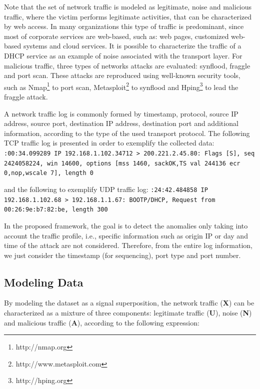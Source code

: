 Note that the set of network traffic is modeled as legitimate, noise and malicious traffic, where the victim performs legitimate activities, that can be characterized by web access. In many organizations this type of traffic is predominant, since most of corporate services are web-based, such as: web pages, customized web-based systems and cloud services. It is possible to characterize the traffic of a DHCP service as an example of noise associated with the transport layer. For malicious traffic, three types of networks attacks are evaluated: synflood, fraggle and port scan. These attacks are reproduced using well-known security tools, such as Nmap\footnote{http://nmap.org} to port scan, Metasploit\footnote{http://www.metasploit.com} to synflood and Hping\footnote{http://hping.org} to lead the fraggle attack.

A network traffic log is commonly formed by timestamp, protocol, source IP address, source port, destination IP address, destination port and additional information, according to the type of the used transport protocol. The following TCP traffic log is presented in order to exemplify the collected data:
\newline
\newline
\texttt{:00:34.099289 IP 192.168.1.102.34712 > 200.221.2.45.80: Flags [S], seq 2424058224, win 14600, options [mss 1460, sackOK,TS val 244136 ecr 0,nop,wscale 7], length 0}
\newline

and the following to exemplify UDP traffic log: 
\newline
\newline
\texttt{:24:42.484858 IP 192.168.1.102.68 > 192.168.1.1.67: BOOTP/DHCP, Request from 00:26:9e:b7:82:be, length 300}
\newline 

In the proposed framework, the goal is to detect the anomalies only taking into account the traffic profile, i.e., specific information such as origin IP or day and time of the attack are not considered. Therefore, from the entire log information, we just consider the timestamp (for sequencing), port type and port number.

\subsection{Modeling Data}
\label{sec:2_ModelingData}

By modeling the dataset as a signal superposition, the network traffic (\textbf{X}) can be characterized as a mixture of three components: legitimate traffic (\textbf{U}), noise (\textbf{N}) and malicious traffic (\textbf{A}), according to the following expression:

